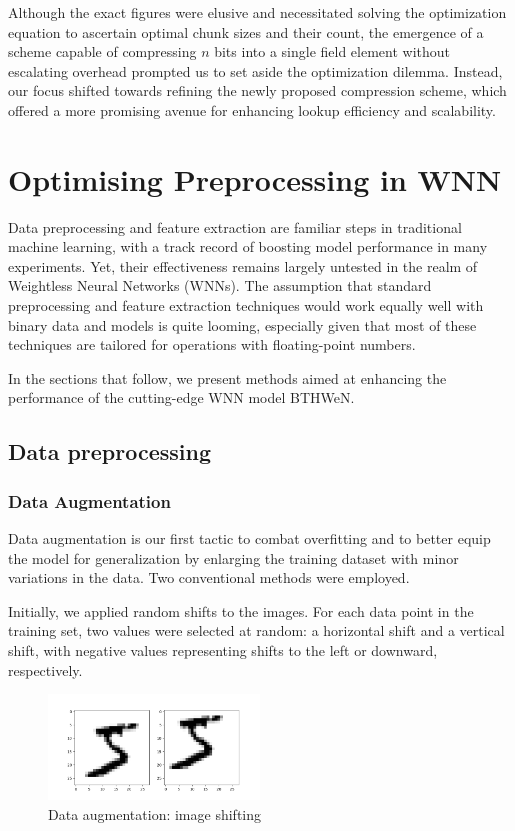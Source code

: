 \documentclass{article}[12pt]
\begin{document}
Although the exact figures were elusive and necessitated solving the optimization equation to ascertain optimal chunk sizes and their count, the emergence of a scheme capable of compressing \( n \) bits into a single field element without escalating overhead prompted us to set aside the optimization dilemma.
Instead, our focus shifted towards refining the newly proposed compression scheme, which offered a more promising avenue for enhancing lookup efficiency and scalability.

\section{Optimising Preprocessing in WNN}\label{sec:optimising-preprocessing-in-wnn}

Data preprocessing and feature extraction are familiar steps in traditional machine learning, with a track record of boosting model performance in many experiments.
Yet, their effectiveness remains largely untested in the realm of Weightless Neural Networks (WNNs).
The assumption that standard preprocessing and feature extraction techniques would work equally well with binary data and models is quite looming, especially given that most of these techniques are tailored for operations with floating-point numbers.

In the sections that follow, we present methods aimed at enhancing the performance of the cutting-edge WNN model BTHWeN\@.

\subsection{Data preprocessing}\label{subsec:data-preprocessing}
\subsubsection*{Data Augmentation}
Data augmentation is our first tactic to combat overfitting and to better equip the model for generalization by enlarging the training dataset with minor variations in the data.
Two conventional methods were employed.

Initially, we applied random shifts to the images.
For each data point in the training set, two values were selected at random: a horizontal shift and a vertical shift, with negative values representing shifts to the left or downward, respectively.

\begin{figure}[h]
    \centering
    \includegraphics[width=0.5\textwidth]{imgs/img_shift}
    \caption{Data augmentation: image shifting}
    \label{fig:fig-1}
\end{figure}
\end{document}
